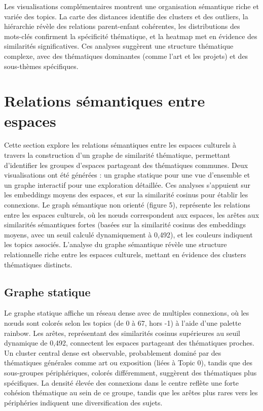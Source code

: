 \documentclass[mstat,12pt]{unswthesis}
\begin{document}
Les visualisations complémentaires montrent une organisation sémantique riche et variée des 
topics. La carte des distances identifie des clusters et des outliers, la hiérarchie révèle des 
relations parent-enfant cohérentes, les distributions des mots-clés confirment la spécificité 
thématique, et la heatmap met en évidence des similarités significatives. Ces analyses 
suggèrent une structure thématique complexe, avec des thématiques dominantes (comme l’art 
et les projets) et des sous-thèmes spécifiques. 

\section{Relations sémantiques entre espaces}

Cette section explore les relations sémantiques entre les espaces culturels à travers la 
construction d’un graphe de similarité thématique, permettant d’identifier les groupes 
d’espaces partageant des thématiques communes. Deux visualisations ont été générées : un 
graphe statique pour une vue d’ensemble et un graphe interactif pour une exploration 
détaillée. Ces analyses s’appuient sur les embeddings moyens des espaces, et sur la similarité 
cosinus pour établir les connexions. 
Le graph sémantique non orienté (figure 5), représente les relations entre les espaces culturels, 
où les nœuds correspondent aux espaces, les arêtes aux similarités sémantiques fortes (basées 
sur la similarité cosinus des embeddings moyens, avec un seuil calculé dynamiquement à 
0,492), et les couleurs indiquent les topics associés.  
L’analyse du graphe sémantique révèle une structure relationnelle riche entre les espaces 
culturels, mettant en évidence des clusters thématiques distincts.


\subsection{Graphe statique }

Le graphe statique affiche un réseau dense avec de multiples connexions, où les nœuds sont 
colorés selon les topics (de 0 à 67, hors -1) à l’aide d’une palette rainbow. Les arêtes, 
représentant des similarités cosinus supérieures au seuil dynamique de 0,492, connectent les 
espaces partageant des thématiques proches. Un cluster central dense est observable, 
probablement dominé par des thématiques générales comme art ou exposition (liées à Topic 
0), tandis que des sous-groupes périphériques, colorés différemment, suggèrent des 
thématiques plus spécifiques. La densité élevée des connexions dans le centre reflète une forte 
cohésion thématique au sein de ce groupe, tandis que les arêtes plus rares vers les périphéries 
indiquent une diversification des sujets.
\end{document}
